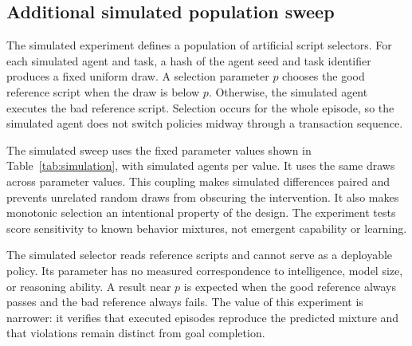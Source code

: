 \documentclass{article}
\begin{document}
\subsection{Additional simulated population sweep}
The simulated experiment defines a population of artificial script selectors. For each simulated agent and task, a hash of the agent seed and task identifier produces a fixed uniform draw. A selection parameter $p$ chooses the good reference script when the draw is below $p$. Otherwise, the simulated agent executes the bad reference script. Selection occurs for the whole episode, so the simulated agent does not switch policies midway through a transaction sequence.\par
The simulated sweep uses the fixed parameter values shown in Table~\ref{tab:simulation}, with \AgentCount{} simulated agents per value. It uses the same draws across parameter values. This coupling makes simulated differences paired and prevents unrelated random draws from obscuring the intervention. It also makes monotonic selection an intentional property of the design. The experiment tests score sensitivity to known behavior mixtures, not emergent capability or learning.\par
The simulated selector reads reference scripts and cannot serve as a deployable policy. Its parameter has no measured correspondence to intelligence, model size, or reasoning ability. A result near $p$ is expected when the good reference always passes and the bad reference always fails. The value of this experiment is narrower: it verifies that executed episodes reproduce the predicted mixture and that violations remain distinct from goal completion.\par
\end{document}
